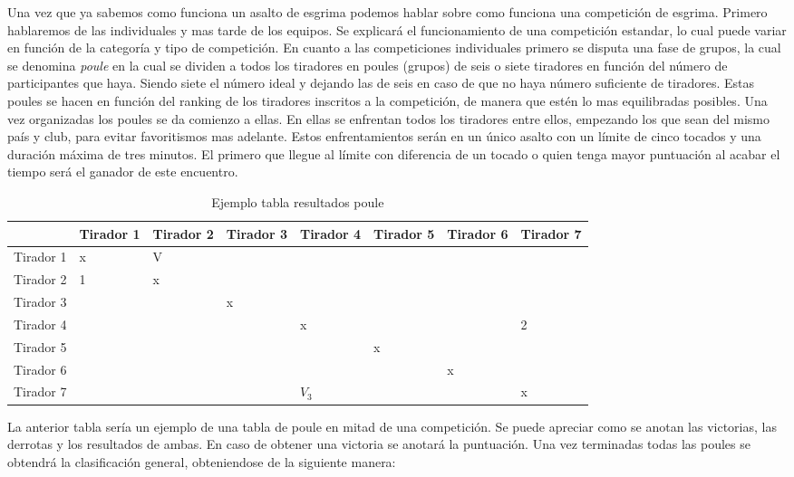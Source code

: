 Una vez que ya sabemos como funciona un asalto de esgrima podemos hablar sobre como funciona una competición
 de esgrima. Primero hablaremos de las individuales y mas tarde de los equipos. Se explicará el funcionamiento
 de una competición estandar, lo cual puede variar en función de la categoría y tipo de competición.
 En cuanto a las competiciones individuales primero se disputa una fase de grupos, la cual se denomina
 \textit{poule} en la cual se dividen a todos los tiradores en poules (grupos) de seis o siete tiradores en función
 del número de participantes que haya. Siendo siete el número ideal y dejando las de seis en caso de que
 no haya número suficiente de tiradores. Estas poules se hacen en función del ranking de los tiradores inscritos
 a la competición, de manera que estén lo mas equilibradas posibles. Una vez organizadas los poules se da
 comienzo a ellas. En ellas se enfrentan todos los tiradores entre ellos, empezando los que sean del mismo
 país y club, para evitar favoritismos mas adelante. Estos enfrentamientos serán en un único asalto con un
 límite de cinco tocados y una duración máxima de tres minutos. El primero que llegue al límite con diferencia
 de un tocado o quien tenga mayor puntuación al acabar el tiempo será el ganador de este encuentro.

\begin{table}[htb]%
  \centering
  \caption{Ejemplo tabla resultados poule}
  \label{tab:anchura}
  \begin{tabular}{ | l | l | l | l | l | l | l | l | }
    \hline
    & Tirador 1 & Tirador 2 & Tirador 3 & Tirador 4 & Tirador 5 & Tirador 6 & Tirador 7 \\ \hline
    Tirador 1 & x & V & & & & & \\ \hline
    Tirador 2 & 1 & x & & & & & \\ \hline
    Tirador 3 & & & x & & & & \\ \hline
    Tirador 4 & & & & x & & & 2 \\ \hline
    Tirador 5 & & & & & x & & \\ \hline
    Tirador 6 & & & & & & x & \\ \hline
    Tirador 7 & & & & $V_3$ & & & x \\
    \hline
  \end{tabular}
\end{table}

La anterior tabla sería un ejemplo de una tabla de poule en mitad de una competición. Se puede apreciar como se anotan
 las victorias, las derrotas y los resultados de ambas. En caso de obtener una victoria se anotará la puntuación. Una vez
 terminadas todas las poules se obtendrá la clasificación general, obteniendose de la siguiente manera:

